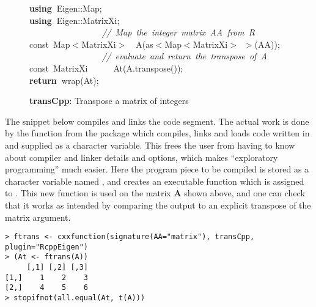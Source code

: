 \documentclass[shortnames,article]{jss}
\newcommand{\hlstd}[1]{\textcolor[rgb]{0,0,0}{#1}}
\newcommand{\hlslc}[1]{\textcolor[rgb]{0.67,0.13,0.13}{\it{#1}}}
\newcommand{\hlsym}[1]{\textcolor[rgb]{0,0,0}{#1}}
\newcommand{\hlkwa}[1]{\textcolor[rgb]{0.61,0.13,0.93}{\bf{#1}}}
\newcommand{\hlkwb}[1]{\textcolor[rgb]{0.13,0.54,0.13}{#1}}
\newcommand{\hlkwd}[1]{\textcolor[rgb]{0,0,0}{#1}}
\begin{document}
\begin{figure}[htb]
    \noindent
    \ttfamily
    \hlstd{}\hlkwa{using\ }\hlstd{Eigen}\hlsym{::}\hlstd{Map}\hlsym{;}\hspace*{\fill}\\
    \hlstd{}\hlkwa{using\ }\hlstd{Eigen}\hlsym{::}\hlstd{MatrixXi}\hlsym{;}\hspace*{\fill}\\
    \hlstd{}\hlstd{\ \ \ \ \ \ \ \ \ \ \ \ \ \ \ \ \ }\hlstd{}\hlslc{//\ Map\ the\ integer\ matrix\ AA\ from\ R}\hspace*{\fill}\\
    \hlstd{}\hlkwb{const\ }\hlstd{Map}\hlsym{$<$}\hlstd{MatrixXi}\hlsym{$>$}\hlstd{\ \ }\hlsym{}\hlstd{}\hlkwd{A}\hlstd{}\hlsym{(}\hlstd{as}\hlsym{$<$}\hlstd{Map}\hlsym{$<$}\hlstd{MatrixXi}\hlsym{$>$\ $>$(}\hlstd{AA}\hlsym{));}\hspace*{\fill}\\
    \hlstd{}\hlstd{\ \ \ \ \ \ \ \ \ \ \ \ \ \ \ \ \ }\hlstd{}\hlslc{//\ evaluate\ and\ return\ the\ transpose\ of\ A}\hspace*{\fill}\\
    \hlstd{}\hlkwb{const\ }\hlstd{MatrixXi}\hlstd{\ \ \ \ \ \ }\hlstd{}\hlkwd{At}\hlstd{}\hlsym{(}\hlstd{A}\hlsym{.}\hlstd{}\hlkwd{transpose}\hlstd{}\hlsym{());}\hspace*{\fill}\\
    \hlstd{}\hlkwa{return\ }\hlstd{}\hlkwd{wrap}\hlstd{}\hlsym{(}\hlstd{At}\hlsym{);}\hlstd{}\hspace*{\fill}
    \normalfont
  \caption{\textbf{transCpp}: Transpose a matrix of integers}
  \label{trans}
\end{figure}

The  snippet below compiles and links the  code
segment. The actual work is done by the function  from the 
package which compiles, links and loads code written in  and
supplied as a character variable.  This frees the user from having to know about
compiler and linker details and options, which makes ``exploratory
programming'' much easier.  Here the program piece to be compiled is stored
as a character variable named , and  creates
an executable function which is assigned to .  This new function
is used on the matrix $\bm A$ shown above, and one can check that it works as intended
by comparing the output to an explicit transpose of the matrix argument.
\begin{verbatim}
> ftrans <- cxxfunction(signature(AA="matrix"), transCpp, plugin="RcppEigen")
> (At <- ftrans(A))
     [,1] [,2] [,3]
[1,]    1    2    3
[2,]    4    5    6
> stopifnot(all.equal(At, t(A)))
\end{verbatim}
\end{document}

